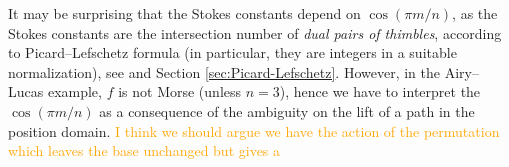 \documentclass{article}
\theoremstyle{definition}
\newcommand{\laplace}{\mathcal{L}}
\begin{document}
It may be surprising that the Stokes constants depend on $\cos(\pi m/n)$, as the Stokes constants are the intersection number of \textit{dual pairs of thimbles}, according to Picard--Lefschetz formula (in particular, they are integers in a suitable normalization), see \cite[Section 5]{pham} and Section \ref{sec:Picard-Lefschetz}. However, in the Airy--Lucas example, $f$ is not Morse (unless $n=3$), hence we have to interpret the $\cos(\pi m/n)$ as a consequence of the ambiguity on the lift of a path in the position domain. \textcolor{orange}{ I think we should argue we have the action of the permutation which leaves the base unchanged but gives a } 






\end{document}
